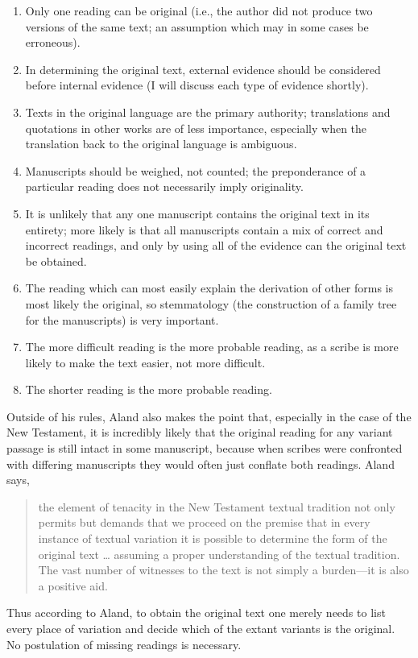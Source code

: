 \documentclass[onecolumn, 12pt]{article}
\begin{document}
\begin{enumerate}
  \item Only one reading can be original (i.e., the author did not produce two
	versions of the same text; an assumption which may in some cases be
	erroneous).
  \item In determining the original text, external evidence should be
	considered before internal evidence (I will discuss each type of evidence
	shortly).
  \item Texts in the original language are the primary authority; translations
	and quotations in other works are of less importance, especially when the
	translation back to the original language is ambiguous.
  \item Manuscripts should be weighed, not counted; the preponderance of a
	particular reading does not necessarily imply originality.
  \item It is unlikely that any one manuscript contains the original text in
	its entirety; more likely is that all manuscripts contain a mix of correct
	and incorrect readings, and only by using all of the evidence can the
	original text be obtained.
  \item The reading which can most easily explain the derivation of other forms
	is most likely the original, so stemmatology (the construction of a family
	tree for the manuscripts) is very important.
  \item The more difficult reading is the more probable reading, as a scribe is
	more likely to make the text easier, not more difficult.
  \item The shorter reading is the more probable reading.
\end{enumerate}

Outside of his rules, Aland also makes the point that, especially in the case
of the New Testament, it is incredibly likely that the original reading for any
variant passage is still intact in some manuscript, because when scribes were
confronted with differing manuscripts they would often just conflate both
readings.  Aland says, 
\begin{quotation}
the element of tenacity in the New Testament textual tradition not only permits
but demands that we proceed on the premise that in every instance of textual
variation it is possible to determine the form of the original text \ldots
assuming a proper understanding of the textual tradition.  The vast number of
witnesses to the text is not simply a burden---it is also a positive
aid.~\cite[p. 294]{aland-text-of-the-new-testament}
\end{quotation}
Thus according to Aland, to obtain the original text one merely
needs to list every place of variation and decide which of the extant variants
is the original.  No postulation of missing readings is necessary.
\end{document}
